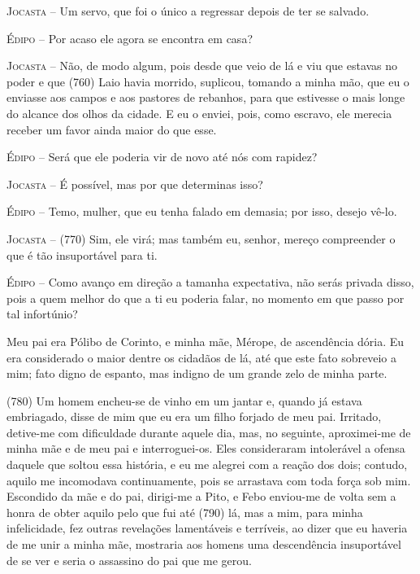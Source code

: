 \textsc{Jocasta} --   Um servo, que foi o único a regressar depois de ter se salvado.

\textsc{Édipo} --   Por acaso ele agora se encontra em casa?

\textsc{Jocasta} --   Não, de modo algum, pois desde que veio de lá e viu que estavas no poder
e que (760) Laio havia morrido, suplicou, tomando a minha mão, que eu o
enviasse aos campos e aos pastores de rebanhos, para que estivesse o
mais longe do alcance dos olhos da cidade. E eu o enviei, pois, como
escravo, ele merecia receber um favor ainda maior do que esse.

\textsc{Édipo} --   Será que ele poderia vir de novo até nós com rapidez?

\textsc{Jocasta} --   É possível, mas por que determinas isso?

\textsc{Édipo} --   Temo, mulher, que eu tenha falado em demasia; por isso, desejo vê-lo.

\textsc{Jocasta} --   (770) Sim, ele virá; mas também eu, senhor, mereço compreender o que é
tão insuportável para ti.

\textsc{Édipo} --   Como avanço em direção a tamanha expectativa, não serás privada disso,
pois a quem melhor do que a ti eu poderia falar, no momento em que passo
por tal infortúnio?

Meu pai era Pólibo de Corinto, e minha mãe, Mérope, de ascendência
dória. Eu era considerado o maior dentre os cidadãos de lá, até que este
fato sobreveio a mim; fato digno de espanto, mas indigno de um grande
zelo de minha parte.

(780) Um homem encheu-se de vinho em um jantar e, quando já estava
embriagado, disse de mim que eu era um filho forjado de meu pai.
Irritado, detive-me com dificuldade durante aquele dia, mas, no
seguinte, aproximei-me de minha mãe e de meu pai e interroguei-os. Eles
consideraram intolerável a ofensa daquele que soltou essa história, e eu
me alegrei com a reação dos dois; contudo, aquilo me incomodava
continuamente, pois se arrastava com toda força sob mim. Escondido da
mãe e do pai, dirigi-me a Pito, e Febo enviou-me de volta sem a honra de
obter aquilo pelo que fui até (790) lá, mas a mim, para minha
infelicidade, fez outras revelações lamentáveis e terríveis, ao dizer
que eu haveria de me unir a minha mãe, mostraria aos homens uma
descendência insuportável de se ver e seria o assassino do pai que me
gerou.

